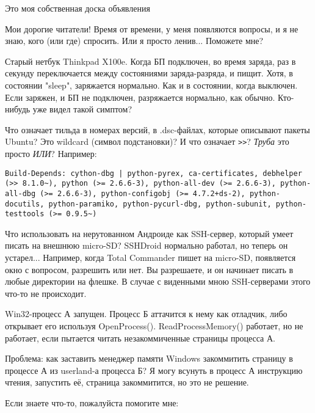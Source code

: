 
\begin{center}
\LARGE{} Это моя собственная доска объявления \normalsize{}
\end{center}

Мои дорогие читатели! Время от времени, у меня появляются вопросы, и я не знаю, кого (или где) спросить.
Или я просто ленив...
Поможете мне?

\myhrule{}

Старый нетбук Thinkpad X100e.
Когда БП подключен, во время заряда, раз в секунду переключается между состояниями заряда-разряда, и пищит.
Хотя, в состоянии "sleep", заряжается нормально.
Как и в состоянии, когда выключен.
Если заряжен, и БП не подключен, разряжается нормально, как обычно.
Кто-нибудь уже видел такой симптом?

\myhrule{}

Что означает тильда в номерах версий, в .dsc-файлах, которые описывают пакеты Ubuntu?
Это wildcard (символ подстановки)?
И что означает \verb|>>|?
\emph{Труба} это просто \emph{ИЛИ}?
Например:

\begin{lstlisting}
Build-Depends: cython-dbg | python-pyrex, ca-certificates, debhelper (>> 8.1.0~), python (>= 2.6.6-3), python-all-dev (>= 2.6.6-3), python-all-dbg (>= 2.6.6-3), python-configobj (>= 4.7.2+ds-2), python-docutils, python-paramiko, python-pycurl-dbg, python-subunit, python-testtools (>= 0.9.5~)
\end{lstlisting}

\myhrule{}

Что использовать на нерутованном Андроиде как SSH-сервер, который умеет писать на внешнюю micro-SD?
SSHDroid нормально работал, но теперь он устарел...
Например, когда Total Commander пишет на micro-SD, появляется окно с вопросом, разрешить или нет.
Вы разрешаете, и он начинает писать в любые директории на флешке.
В случае с виденными мною SSH-серверами этого что-то не происходит.

\myhrule{}

Win32-процесс А запущен.
Процесс Б аттачится к нему как отладчик, либо открывает его используя OpenProcess().
ReadProcessMemory() работает, но не работает, если пытается читать незакоммиченные страницы процесса А.

Проблема: как заставить менеджер памяти Windows закоммитить страницу в процессе А из userland-а процесса Б?
Я могу всунуть в процесс А инструкцию чтения, запустить её, страница закоммитится, но это не решение.

\myhrule{}

Если знаете что-то, пожалуйста помогите мне: \EMAIL{}

